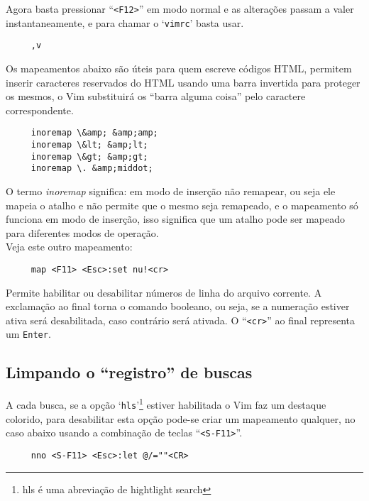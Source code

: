 Agora basta pressionar ``\verb|<F12>|'' em modo normal e as alterações passam a valer
instantaneamente, e para chamar o `\texttt{vimrc}' basta usar.

\begin{verbatim}
     ,v
\end{verbatim}

Os mapeamentos abaixo são úteis para quem escreve códigos HTML, permitem
inserir caracteres reservados do HTML usando uma barra invertida para proteger
os mesmos, o Vim substituirá os ``barra alguma coisa'' pelo caractere
correspondente.

\begin{verbatim}
     inoremap \&amp; &amp;amp;
     inoremap \&lt; &amp;lt;
     inoremap \&gt; &amp;gt;
     inoremap \. &amp;middot;
\end{verbatim}

O termo {\em inoremap} significa: em modo de inserção não remapear, ou seja
ele mapeia o atalho e não permite que o mesmo seja remapeado, e o
mapeamento só funciona em modo de inserção, isso significa que um atalho
pode ser mapeado para diferentes modos de operação. \\

Veja este outro mapeamento:

\begin{verbatim}
     map <F11> <Esc>:set nu!<cr>
\end{verbatim}

Permite habilitar ou desabilitar números de linha do arquivo corrente.
A exclamação ao final torna o comando booleano, ou seja, se a
numeração estiver ativa será desabilitada, caso contrário será
ativada. O ``\verb|<cr>|'' ao final representa um {\tt Enter}.

\subsection{Limpando o ``registro'' de buscas}
\label{Limpando o ``registro'' de buscas}

A cada busca, se a opção `{\tt hls}'\footnote{hls é uma abreviação de
hightlight search} estiver habilitada o Vim faz um destaque colorido, para
desabilitar esta opção pode-se criar um mapeamento qualquer, no caso abaixo
usando a combinação de teclas ``\verb|<S-F11>|''.

\begin{verbatim}
     nno <S-F11> <Esc>:let @/=""<CR>
\end{verbatim}

